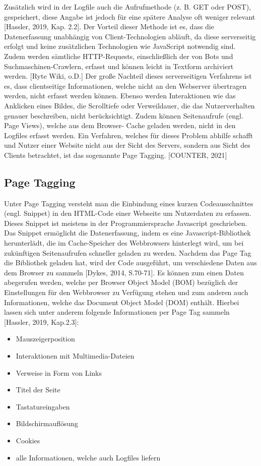 Zusätzlich wird in der Logfile auch die Aufrufmethode (z. B. GET oder POST),  gespeichert, diese Angabe ist jedoch für eine spätere Analyse oft weniger relevant [Hassler, 2019, Kap. 2.2]. Der Vorteil dieser Methode ist es, dass die Datenerfassung unabhängig von Client-Technologien abläuft, da diese serverseitig erfolgt und keine zusätzlichen Technologien wie JavaScript notwendig sind. Zudem werden sämtliche HTTP-Requests, einschließlich der von Bots und Suchmaschinen-Crawlern, erfasst und können leicht in Textform archiviert werden. [Ryte Wiki, o.D.]
Der große Nachteil dieses serverseitigen Verfahrens ist es, dass clientseitige Informationen, welche nicht an den Webserver übertragen werden, nicht erfasst werden können. Ebenso werden Interaktionen wie das Anklicken eines Bildes, die Scrolltiefe oder Verweildauer, die das Nutzerverhalten genauer beschreiben, nicht berücksichtigt. Zudem können Seitenaufrufe (engl. Page Views), welche aus dem Browser- Cache geladen werden, nicht in den Logfiles erfasst werden. Ein Verfahren, welches für dieses Problem abhilfe schafft und Nutzer einer Website nicht aus der Sicht des Servers, sondern aus Sicht des Clients betrachtet, ist das sogenannte Page Tagging. [COUNTER, 2021]

\subsection{Page Tagging}
Unter Page Tagging versteht man die Einbindung eines kurzen Codeausschnittes (engl. Snippet) in den HTML-Code einer Webseite um Nutzerdaten zu erfassen. Dieses Snippet ist meistens in der Programmiersprache Javascript geschrieben. Das Snippet ermöglicht die Datenerfassung, indem es eine Javascript-Bibliothek herunterlädt, die im Cache-Speicher des Webbrowsers hinterlegt wird, um bei zukünftigen Seitenaufrufen schneller geladen zu werden. Nachdem das Page Tag die Bibliothek geladen hat, wird der Code ausgeführt, um verschiedene Daten aus dem Browser zu sammeln [Dykes, 2014, S.70-71]. Es können zum einen Daten abegerufen werden, welche per Browser Object Model (BOM) bezüglich der Einstellungen für den Webbrowser zu Verfügung stehen und zum anderen auch Informationen, welche das Document Object Model (DOM) enthält. Hierbei lassen sich unter anderem folgende Informationen per Page Tag sammeln [Hassler, 2019, Kap.2.3]:  

\begin{itemize}
    \item Mauszeigerposition
    \item Interaktionen mit Multimedia-Dateien
    \item Verweise in Form von Links
    \item Titel der Seite
    \item Tastatureingaben
    \item Bildschirmauflösung
    \item Cookies
    \item alle Informationen, welche auch Logfiles liefern
\end{itemize}

